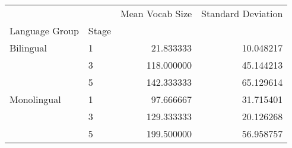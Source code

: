 \begin{tabular}{llrr}
\toprule
            &   &  Mean Vocab Size &  Standard Deviation \\
Language Group & Stage &                  &                     \\
\midrule
Bilingual & 1 &        21.833333 &           10.048217 \\
            & 3 &       118.000000 &           45.144213 \\
            & 5 &       142.333333 &           65.129614 \\
Monolingual & 1 &        97.666667 &           31.715401 \\
            & 3 &       129.333333 &           20.126268 \\
            & 5 &       199.500000 &           56.958757 \\
\bottomrule
\end{tabular}
